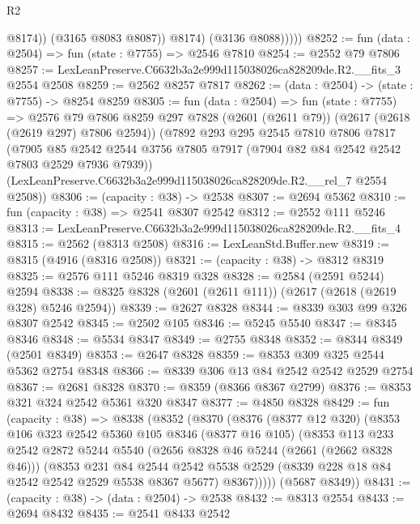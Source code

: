 \begin{lexlean}{R2}
\begin{coremodule}
                    @8174))
                (@3165 @8083 @8087))
              @8174)
            (@3136 @8088)))))
@8252 := fun (data : @2504) => fun (state : @7755) => @2546 @7810
@8254 := @2552 @79 @7806
@8257 := LexLeanPreserve.C6632b3a2e999d115038026ca828209de.R2.__fits_3 @2554 @2508
@8259 := @2562 @8257 @7817
@8262 := (data : @2504) -> (state : @7755) -> @8254 @8259
@8305 := fun (data : @2504) =>
  fun (state : @7755) =>
  @2576
    @79
    @7806
    @8259
    @297
    @7828
    (@2601 (@2611 @79))
    (@2617 (@2618 (@2619 @297) @7806 @2594))
    (@7892
      @293
      @295
      @2545
      @7810
      @7806
      @7817
      (@7905 @85 @2542 @2544 @3756 @7805 @7917 (@7904 @82 @84 @2542 @2542 @7803 @2529 @7936 @7939))
      (LexLeanPreserve.C6632b3a2e999d115038026ca828209de.R2.__rel_7 @2554 @2508))
@8306 := (capacity : @38) -> @2538
@8307 := @2694 @5362
@8310 := fun (capacity : @38) => @2541 @8307 @2542
@8312 := @2552 @111 @5246
@8313 := LexLeanPreserve.C6632b3a2e999d115038026ca828209de.R2.__fits_4
@8315 := @2562 (@8313 @2508)
@8316 := LexLeanStd.Buffer.new
@8319 := @8315 (@4916 (@8316 @2508))
@8321 := (capacity : @38) -> @8312 @8319
@8325 := @2576 @111 @5246 @8319 @328
@8328 := @2584 (@2591 @5244) @2594
@8338 := @8325 @8328 (@2601 (@2611 @111)) (@2617 (@2618 (@2619 @328) @5246 @2594))
@8339 := @2627 @8328
@8344 := @8339 @303 @99 @326 @8307 @2542
@8345 := @2502 @105
@8346 := @5245 @5540
@8347 := @8345 @8346
@8348 := @5534 @8347
@8349 := @2755 @8348
@8352 := @8344 @8349 (@2501 @8349)
@8353 := @2647 @8328
@8359 := @8353 @309 @325 @2544 @5362 @2754 @8348
@8366 := @8339 @306 @13 @84 @2542 @2542 @2529 @2754
@8367 := @2681 @8328
@8370 := @8359 (@8366 @8367 @2799)
@8376 := @8353 @321 @324 @2542 @5361 @320 @8347
@8377 := @4850 @8328
@8429 := fun (capacity : @38) =>
  @8338
    (@8352
      (@8370
        (@8376
          (@8377 @12 @320)
          (@8353
            @106
            @323
            @2542
            @5360
            @105
            @8346
            (@8377 @16 @105)
            (@8353
              @113
              @233
              @2542
              @2872
              @5244
              @5540
              (@2656 @8328 @46 @5244 (@2661 (@2662 @8328 @46)))
              (@8353
                @231
                @84
                @2544
                @2542
                @5538
                @2529
                (@8339 @228 @18 @84 @2542 @2542 @2529 @5538 @8367 @5677)
                @8367)))))
      (@5687 @8349))
@8431 := (capacity : @38) -> (data : @2504) -> @2538
@8432 := @8313 @2554
@8433 := @2694 @8432
@8435 := @2541 @8433 @2542

\end{coremodule}
\end{lexlean}
